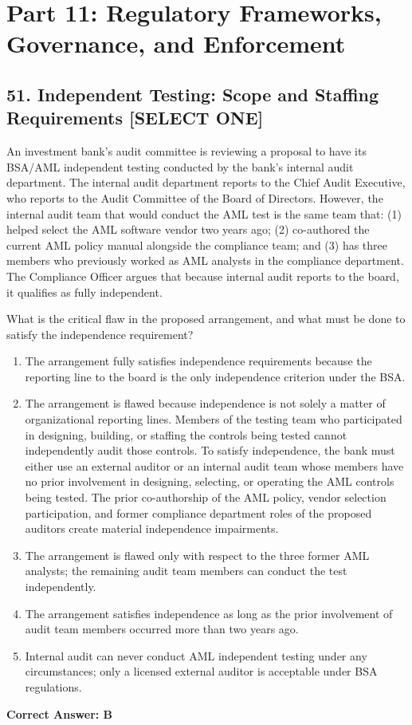 \documentclass[11pt,a4paper]{article}
\begin{document}
	\section{Part 11: Regulatory Frameworks, Governance, and Enforcement}
	
	\subsection{51. Independent Testing: Scope and Staffing Requirements \textnormal{[SELECT ONE]}}
	
	An investment bank's audit committee is reviewing a proposal to have its BSA/AML independent testing conducted by the bank's internal audit department. The internal audit department reports to the Chief Audit Executive, who reports to the Audit Committee of the Board of Directors. However, the internal audit team that would conduct the AML test is the same team that: (1) helped select the AML software vendor two years ago; (2) co-authored the current AML policy manual alongside the compliance team; and (3) has three members who previously worked as AML analysts in the compliance department. The Compliance Officer argues that because internal audit reports to the board, it qualifies as fully independent.
	
	What is the critical flaw in the proposed arrangement, and what must be done to satisfy the independence requirement?
	
	\begin{enumerate}[label=\Alph*.]
		\item The arrangement fully satisfies independence requirements because the reporting line to the board is the only independence criterion under the BSA.
		\item The arrangement is flawed because independence is not solely a matter of organizational reporting lines. Members of the testing team who participated in designing, building, or staffing the controls being tested cannot independently audit those controls. To satisfy independence, the bank must either use an external auditor or an internal audit team whose members have no prior involvement in designing, selecting, or operating the AML controls being tested. The prior co-authorship of the AML policy, vendor selection participation, and former compliance department roles of the proposed auditors create material independence impairments.
		\item The arrangement is flawed only with respect to the three former AML analysts; the remaining audit team members can conduct the test independently.
		\item The arrangement satisfies independence as long as the prior involvement of audit team members occurred more than two years ago.
		\item Internal audit can never conduct AML independent testing under any circumstances; only a licensed external auditor is acceptable under BSA regulations.
	\end{enumerate}
	\textbf{Correct Answer: B}
	
\end{document}
